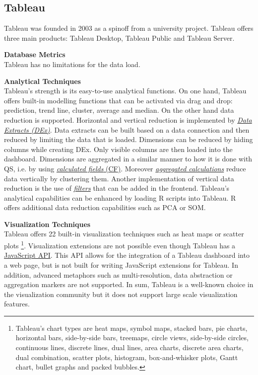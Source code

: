 \subsection{Tableau}\label{tool:Tableau}
Tableau was founded in 2003 as a spinoff from  a university project. Tableau offers three main products: Tableau Desktop, Tableau Public and Tableau Server.
\par
\textbf{Database Metrics}\\
Tableau has no limitations for the data load.
\par
\textbf{Analytical Techniques}\\
Tableau's strength is its easy-to-use analytical functions. On one hand, Tableau offers built-in modelling functions that can be activated via drag and drop: prediction, trend line, cluster, average and median. On the other hand data reduction is supported. Horizontal and vertical reduction is implemented by \href{http://onlinehelp.tableau.com/current/pro/desktop/en-us/extracting_data.html}{\textit{Data Extracts  (\gls{DEx})}}. Data extracts can be built based on a data connection and then reduced by limiting the data that is loaded. Dimensions can be reduced by hiding columns while creating \gls{DEx}. Only visible columns are then loaded into the dashboard. Dimensions are aggregated in a similar manner to how it is done with \gls{QS}, i.e. by using \href{http://onlinehelp.tableau.com/current/pro/desktop/en-us/calculations_calculatedfields.html}{\textit{calculated fields} (\gls{CF})}. Moreover  \href{http://onlinehelp.tableau.com/current/pro/desktop/en-us/calculations_calculatedfields_aggregate.html}{\textit{aggregated calculations}} reduce data vertically by clustering them. Another implementation of vertical data reduction is the use of  \href{http://kb.tableau.com/articles/howto/adding-filters-to-dashboards}{\textit{filters}} that can be added in the frontend. Tableau's analytical capabilities can be enhanced by loading R scripts into Tableau. R offers additional data reduction capabilities such as \gls{PCA} or \gls{SOM}.
\par
\textbf{Visualization Techniques}\\
Tableau offers 22 built-in visualization techniques such as heat maps or scatter plots \cite{Tableau2003} \footnote{Tableau's chart types are heat maps, symbol maps, stacked bars, pie charts, horizontal bars, side-by-side bars, treemaps, circle views, side-by-side circles, continuous lines, discrete lines, dual lines, area charts,  discrete area charts, dual combination, scatter plots, histogram, box-and-whisker plots, Gantt chart, bullet graphs and packed bubbles.}.
Visualization extensions are not possible even though Tableau has a \href{https://www.google.de/search?client=safari&rls=en&q=tableau+javascript+api&ie=UTF-8&oe=UTF-8&gfe_rd=cr&ei=2oLOWKveK5LZ8AeXl4bIBw}{JavaScript API}. This API allows for the integration of a Tableau dashboard into a web page, but is not built for writing JavaScript extensions for Tableau. In addition, advanced metaphors such as multi-resolution, data abstraction or aggregation markers are not supported. 
In sum, Tableau is a well-known choice in the visualization community but it does not support large scale visualization features. 
\par

